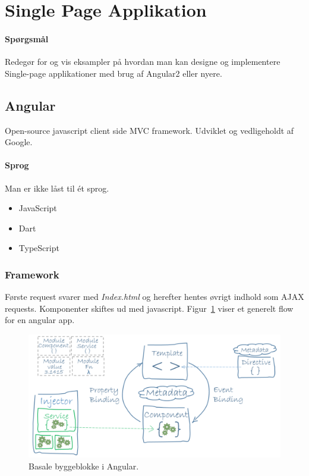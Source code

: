 \section{Single Page Applikation}

\paragraph{Spørgsmål}
Redegør for og vis eksampler på hvordan man kan designe	og implementere Single-page applikationer med brug af	Angular2 eller nyere.

\subsection{Angular}
Open-source javascript client side MVC framework. Udviklet og vedligeholdt af Google.

\paragraph{Sprog} Man er ikke låst til ét sprog.

\begin{multicols}{5}
	\begin{itemize}
		\item JavaScript
		\item Dart
		\item TypeScript
	\end{itemize}
\end{multicols}

\subsubsection{Framework}
Første request svarer med \textit{Index.html} og herefter hentes øvrigt indhold som AJAX requests. Komponenter skiftes ud med javascript. Figur~\ref{fig:ng-basics} viser et generelt flow for en angular app.

\begin{figure}[H]
	\centering
	\includegraphics[width=\linewidth]{figs/ng-basics}
	\caption{Basale byggeblokke i Angular.}
	\label{fig:ng-basics}
\end{figure}

